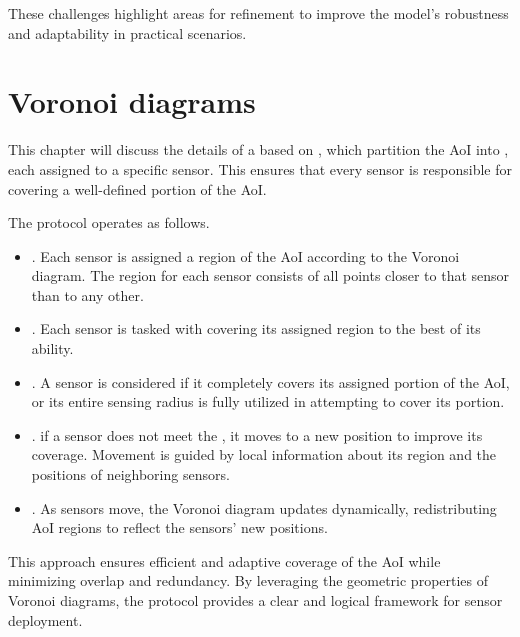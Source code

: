 \documentclass[a4paper, 12pt]{report}
\begin{document}
    These challenges highlight areas for refinement to improve the model's robustness and adaptability in practical scenarios.

    \section{Voronoi diagrams}

    This chapter will discuss the details of a  based on \href{https://en.wikipedia.org/wiki/Voronoi_diagram}{}, which partition the AoI into , each assigned to a specific sensor. This ensures that every sensor is responsible for covering a well-defined portion of the AoI.


    The protocol operates as follows.

    \begin{itemize}
        \item {}. Each sensor is assigned a region of the AoI according to the Voronoi diagram. The region for each sensor consists of all points closer to that sensor than to any other.  
        
        \item {}. Each sensor is tasked with covering its assigned region to the best of its ability.  
        
        \item {}. A sensor is considered  if it completely covers its assigned portion of the AoI, or its entire sensing radius is fully utilized in attempting to cover its portion.
        
        \item {}. if a sensor does not meet the , it moves to a new position to improve its coverage. Movement is guided by local information about its region and the positions of neighboring sensors.  
        
        \item {}. As sensors move, the Voronoi diagram updates dynamically, redistributing AoI regions to reflect the sensors' new positions.  
    \end{itemize}

    This approach ensures efficient and adaptive coverage of the AoI while minimizing overlap and redundancy. By leveraging the geometric properties of Voronoi diagrams, the protocol provides a clear and logical framework for sensor deployment.
\end{document}
